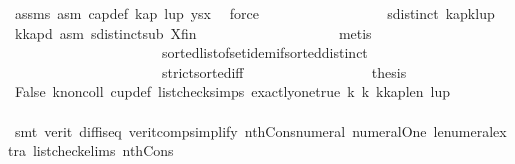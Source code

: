 \begin{isabellebody}
\ assms{\isacharparenleft}{\kern0pt}{}{\isacharparenright}{\kern0pt}\ asm{\isacharparenleft}{\kern0pt}{}{\isacharparenright}{\kern0pt}\ cap{\isacharunderscore}{\kern0pt}def\ kap{\isacharparenleft}{\kern0pt}{}{\isacharcomma}{\kern0pt}{}{\isacharparenright}{\kern0pt}\ lup{\isacharparenleft}{\kern0pt}{}{\isacharparenright}{\kern0pt}\ ysx\ \isamarkupfalse%
\ force\isanewline
\ \ \ \ \ \ \ \ \ \ \ \ \ \ \ \ \isamarkupfalse%
\ {\isachardoublequoteopen}sdistinct\ {\isacharparenleft}{\kern0pt}kap{\isacharbang}{\kern0pt}{\isacharparenleft}{\kern0pt}k{\isacharminus}{\kern0pt}{}{\isacharparenright}{\kern0pt}{\isacharhash}{\kern0pt}lup{\isacharparenright}{\kern0pt}{\isachardoublequoteclose}\ \isamarkupfalse%
\ k{\isacharunderscore}{\kern0pt}kap{\isacharunderscore}{\kern0pt}d\ asm{\isacharparenleft}{\kern0pt}{}{\isacharparenright}{\kern0pt}\ sdistinct{\isacharunderscore}{\kern0pt}sub\ X{\isacharunderscore}{\kern0pt}fin\isanewline
\ \ \ \ \ \ \ \ \ \ \ \ \ \ \ \ \ \ \isamarkupfalse%
\ {\isacharparenleft}{\kern0pt}metis\isanewline
\ \ \ \ \ \ \ \ \ \ \ \ \ \ \ \ \ \ \ \ \ \ sorted{\isacharunderscore}{\kern0pt}list{\isacharunderscore}{\kern0pt}of{\isacharunderscore}{\kern0pt}set{\isachardot}{\kern0pt}idem{\isacharunderscore}{\kern0pt}if{\isacharunderscore}{\kern0pt}sorted{\isacharunderscore}{\kern0pt}distinct\isanewline
\ \ \ \ \ \ \ \ \ \ \ \ \ \ \ \ \ \ \ \ \ \ strict{\isacharunderscore}{\kern0pt}sorted{\isacharunderscore}{\kern0pt}iff{\isacharparenright}{\kern0pt}\isanewline
\ \ \ \ \ \ \ \ \ \ \ \ \ \ \ \ \isamarkupfalse%
\ {\isacharquery}{\kern0pt}thesis\ \isamarkupfalse%
\ False\ k{\isacharunderscore}{\kern0pt}noncoll\ cup{\isacharunderscore}{\kern0pt}def\ list{\isacharunderscore}{\kern0pt}check{\isachardot}{\kern0pt}simps\ exactly{\isacharunderscore}{\kern0pt}one{\isacharunderscore}{\kern0pt}true\ k{}\ k{}\ k{\isacharunderscore}{\kern0pt}kap{\isacharunderscore}{\kern0pt}len\ lup\isanewline
\ \ \ \ \ \ \ \ \ \ \ \ \ \ \ \ \ \ \isamarkupfalse%
\ {\isacharparenleft}{\kern0pt}smt\ {\isacharparenleft}{\kern0pt}verit{\isacharparenright}{\kern0pt}\ diff{\isacharunderscore}{\kern0pt}is{\isacharunderscore}{\kern0pt}{}{\isacharunderscore}{\kern0pt}eq{\isacharprime}{\kern0pt}\ verit{\isacharunderscore}{\kern0pt}comp{\isacharunderscore}{\kern0pt}simplify{}{\isacharparenleft}{\kern0pt}{}{\isacharparenright}{\kern0pt}\ nth{\isacharunderscore}{\kern0pt}Cons{\isacharunderscore}{\kern0pt}numeral\ numeral{\isacharunderscore}{\kern0pt}One\ le{\isacharunderscore}{\kern0pt}numeral{\isacharunderscore}{\kern0pt}extra{\isacharparenleft}{\kern0pt}{}{\isacharparenright}{\kern0pt}\ list{\isacharunderscore}{\kern0pt}check{\isachardot}{\kern0pt}elims{\isacharparenleft}{\kern0pt}{}{\isacharparenright}{\kern0pt}\ nth{\isacharunderscore}{\kern0pt}Cons{\isacharunderscore}{\kern0pt}{}{\isacharparenright}{\kern0pt}\isanewline

\end{isabellebody}

